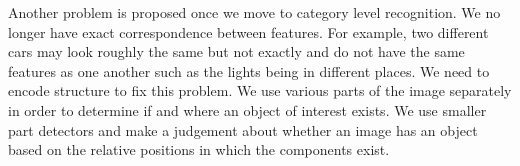\documentclass{article}
\begin{document}
	\par 
	Another problem is proposed once we move to category level recognition. We no longer have exact correspondence between features. For example, two different cars may look roughly the same but not exactly and do not have the same features as one another such as the lights being in different places. We need to encode structure to fix this problem. We use various parts of the image separately in order to determine if and where an object of interest exists. We use smaller part detectors and make a judgement about whether an image has an object based on the relative positions in which the components exist.
	\newpage
	\listoffigures
	\printindex
\end{document}

